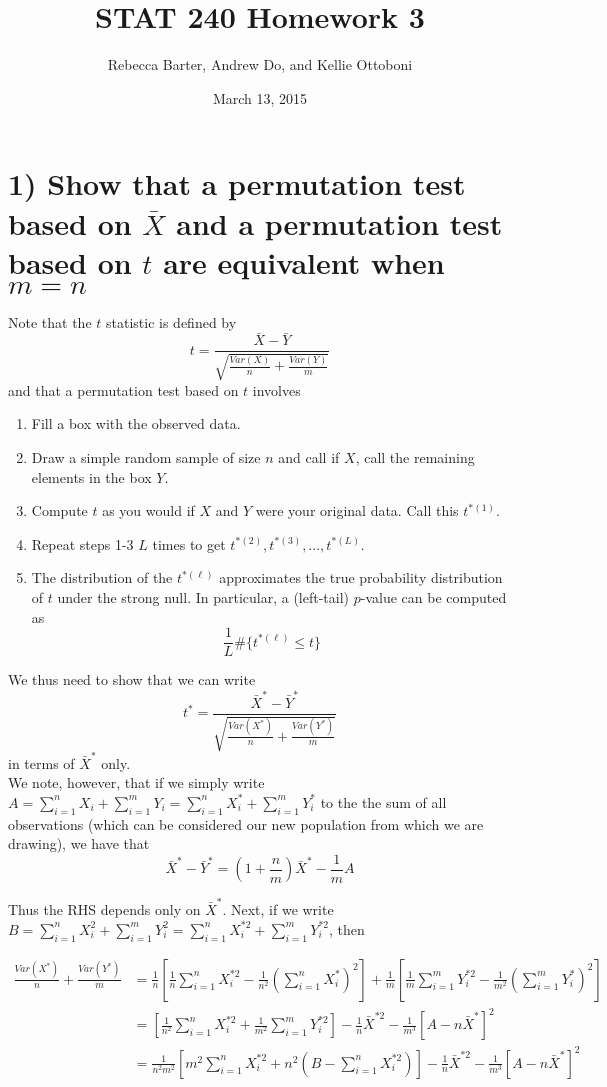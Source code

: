 \documentclass[11pt]{article}
\title{STAT 240 Homework 3}
\author{Rebecca Barter, Andrew Do, and Kellie Ottoboni}
\date{March 13, 2015} %
\begin{document}
\maketitle


\section*{1) Show that a permutation test based on $\bar{X}$ and a permutation test based on $t$ are equivalent when $m = n$} %

\noindent Note that the $t$ statistic is defined by
$$t = \frac{\bar{X} - \bar{Y}}{\sqrt{\frac{Var(X)}{n} + \frac{Var(Y)}{m}}}$$
\noindent and that a permutation test based on $t$ involves
\begin{enumerate}
\item Fill a box with the observed data.
\item Draw a simple random sample of size $n$ and call if $X$, call the remaining elements in the box $Y$.
\item Compute $t$ as you would if $X$ and $Y$ were your original data. Call this $t^{*(1)}$.
\item Repeat steps 1-3 $L$ times to get $t^{*(2)}, t^{*(3)}, ..., t^{*(L)}$.
\item The distribution of the $t^{*(\ell)}$ approximates the true probability distribution of $t$ under the strong null. In particular, a (left-tail) $p$-value can be computed as
$$\frac{1}{L} \# \{t^{*(\ell)} \leq t\}$$
\end{enumerate}

\noindent We thus need to show that we can write
$$t^* = \frac{\bar{X}^* - \bar{Y}^*}{\sqrt{\frac{Var(X^*)}{n} + \frac{Var(Y^*)}{m}}}$$
\noindent in terms of $\bar{X}^*$ only.\\


\noindent We note, however, that if we simply write $A = \sum_{i=1}^n X_i + \sum_{i=1}^m Y_i   = \sum_{i=1}^n X_i^* + \sum_{i=1}^m Y_i^*$ to the the sum of all observations (which can be considered our new population from which we are drawing), we have that
$$\bar{X}^* - \bar{Y}^* = \left(1 + \frac{n}{m} \right) \bar{X}^* - \frac1m A$$

\noindent Thus the RHS depends only on $\bar{X}^*$. Next, if we write $B =\sum_{i=1}^n X_i^2 + \sum_{i=1}^m Y_i^2 = \sum_{i=1}^n X_i^{*2} +\sum_{i=1}^m Y_i^{*2}$, then 

\begin{align*}
\frac{Var(X^*)}{n} + \frac{Var(Y^*)}{m} &= \frac{1}{n} \left[ \frac1n \sum_{i=1}^n X_i^{*2} - \frac{1}{n^2} \left( \sum_{i=1}^n X_i^*\right)^2 \right] + \frac{1}{m} \left[ \frac1m \sum_{i=1}^m Y_i^{*2} - \frac{1}{m^2} \left( \sum_{i=1}^m Y_i^*\right)^2 \right]\\
& = \left[ \frac{1}{n^2} \sum_{i=1}^n X_i^{*2} + \frac{1}{m^2} \sum_{i=1}^m Y_i^{*2} \right] - \frac1n\bar{X}^{*2} - \frac{1}{m^3} \left[A - n \bar{X}^* \right]^2\\
& = \frac{1}{n^2m^2}\left[ m^2 \sum_{i=1}^n X_i^{*2} + n^2\left(B - \sum_{i=1}^n X_i^{*2}\right) \right] - \frac1n\bar{X}^{*2} - \frac{1}{m^3} \left[A - n \bar{X}^* \right]^2
\end{align*}
\end{document}
